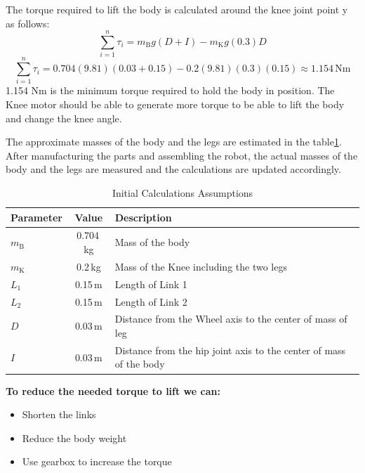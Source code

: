 The torque required to lift the body is calculated around the knee joint point y as follows:
\begin{equation}
	\sum_{i=1}^{n} \tau_{i}=m_{\mathrm{B}}g(D+I)-m_{\mathrm{K}}g(0.3)D
\end{equation}
\begin{equation}
	\sum_{i=1}^{n} \tau_{i}=0.704(9.81)(0.03+0.15)-0.2(9.81)(0.3)(0.15) \approx 1.154 \,\mathrm{Nm}
\end{equation}
1.154 $\mathrm{Nm}$ is the minimum torque required to hold the body in position.
The Knee motor should be able to generate more torque to be able to lift the body and change the knee angle.

The approximate masses of the body and the legs are estimated in the table\ref{tab:initialcalculationsassumptions}.
After manufacturing the parts and assembling the robot, the actual masses of the body and the legs are measured and the calculations are updated accordingly.
\begin{table}[h]
    \centering
    \caption{Initial Calculations Assumptions}
    \label{tab:initialcalculationsassumptions}
    \begin{tabular}{lcl}
        \toprule
        Parameter & Value & Description \\
        \midrule
        $m_{\mathrm{B}}$         & 0.704\,kg  & Mass of the body \\
        $m_{\mathrm{K}}$         & 0.2\,kg    & Mass of the Knee including the two legs \\
        $L_1$                    & 0.15\,m    & Length of Link 1 \\
        $L_2$                    & 0.15\,m    & Length of Link 2 \\
        $D$                      & 0.03\,m    & Distance from the Wheel axis to the center of mass of leg \\
        $I$                      & 0.03\,m    & Distance from the hip joint axis to the center of mass of the body \\
        \bottomrule
    \end{tabular}
\end{table}

\begin{notebox}
	\textbf{To reduce the needed torque to lift we can:}
	\begin{itemize}
		\item Shorten the links
		\item Reduce the body weight
		\item Use gearbox to increase the torque
	\end{itemize}
\end{notebox}

